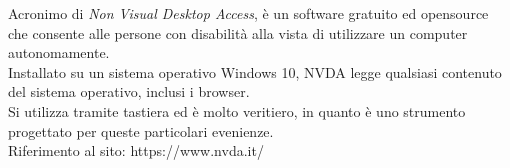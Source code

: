 Acronimo di \emph{Non Visual Desktop Access}, è un software gratuito ed opensource che consente alle persone con disabilità alla vista di utilizzare un computer autonomamente.\\ 
Installato su un sistema operativo Windows 10, NVDA legge qualsiasi contenuto del sistema operativo, inclusi i browser.\\ 
Si utilizza tramite tastiera ed è molto veritiero, in quanto è uno strumento progettato per queste particolari evenienze.\\
Riferimento al sito: https://www.nvda.it/

\newpage